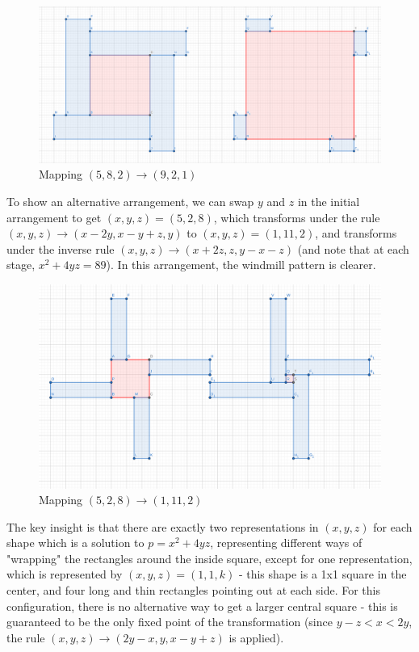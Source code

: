 \documentclass{article}
\begin{document}
\begin{figure}
	\includegraphics[width=\linewidth, bb=0px 0px 800px 400px]{windmill1.png}
	\caption{Mapping $(5,8,2) \to (9,2,1)$}
	\label{fig:windmill1}
\end{figure}

To show an alternative arrangement, we can swap $y$ and $z$ in the initial arrangement
to get $(x,y,z)=(5,2,8)$, which transforms under the rule $(x,y,z) \to (x-2y, x-y+z, y)$
to $(x,y,z) = (1, 11, 2)$, and transforms under the inverse rule $(x,y,z) \to 
(x+2z, z, y-x-z)$ (and note that at each stage, $x^2+4yz = 89$). In this arrangement,
the windmill pattern is clearer.


\begin{figure}
	\includegraphics[width=\linewidth, viewport=0px 0px 1200px 715px]{windmill2.png}
	\caption{Mapping $(5,2,8) \to (1,11,2)$}
	\label{fig:windmill2}
\end{figure}

The key insight is that there are exactly two representations in $(x,y,z)$ for each shape
which is a solution to $p=x^2+4yz$, representing different ways of "wrapping" the
rectangles around the inside square, except for one representation, which is represented
by $(x,y,z) = (1,1,k)$ - this shape is a 1x1 square in the center, and four long and thin
rectangles pointing out at each side. For this configuration, there is no alternative way
to get a larger central square - this is guaranteed to be the only fixed point of the
transformation (since $y-z < x < 2y$, the rule $(x,y,z) \to (2y-x, y, x-y+z)$ is applied).
\end{document}
